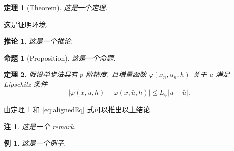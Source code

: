 \documentclass[a4paper,12pt]{article}
\makeatletter
\theoremstyle{plain}
\newtheorem{proposition}{命题}[section]
\newtheorem{theorem}{定理}[section]
\newtheorem{example}{例}[section]
\newtheorem{corollary}{推论}[section]
\newtheorem{remark}{注}[section]
\renewcommand{\proofname}{证明}
\renewenvironment{proof}[1][\proofname]{\par
  \pushQED{\qed}%
  \normalfont \topsep0\p@\@plus3\p@\relax
  \trivlist\item[\hskip\labelsep
  \bfseries #1\@addpunct{\,:\,}]\ignorespaces
}{%
  \popQED\endtrivlist\@endpefalse
}
\makeatother
\begin{document}
\begin{theorem}[Theorem]\label{thm:foo}
这是一个定理.
\end{theorem}
\begin{proof}
这是证明环境.
\end{proof}

\begin{corollary}\label{cor:foo}
这是一个推论.
\end{corollary}

\begin{proposition}[Proposition]
这是一个命题.
\end{proposition}

\begin{theorem}\label{thm:convergence}
假设单步法具有 $p$ 阶精度, 且増量函数 $\varphi(x_{n}, u_{n}, h)$ 关于 $u$ 满足\textup{Lipschitz} 条件
\begin{equation}\label{eq:conver2}
|\varphi(x, u, h)-\varphi(x, \bar{u}, h)| \leqslant L_{\varphi}|u-\bar{u}|.
\end{equation}
\end{theorem}
\begin{proof}[\normalfont\bfseries 证明~\nopunct]
由定理 \ref{thm:foo} 和 \eqref{eq:alignedEq} 式可以推出以上结论.
\end{proof}

\begin{remark}\label{rem:remark}
这是一个 remark.
\end{remark}

\begin{example}
这是一个例子.
\end{example}




{} %








%
%
%
%
%
\end{document}

